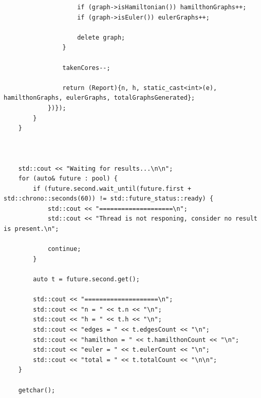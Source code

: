 \documentclass[a4paper,14pt]{extarticle}
\begin{document}
\begin{enumerate}[1.]
\begin{verbatim}
                    if (graph->isHamiltonian()) hamilthonGraphs++;
                    if (graph->isEuler()) eulerGraphs++;

                    delete graph;
                }

                takenCores--;

                return (Report){n, h, static_cast<int>(e), hamilthonGraphs, eulerGraphs, totalGraphsGenerated};
            })});
        }
    }



    std::cout << "Waiting for results...\n\n";
    for (auto& future : pool) {
        if (future.second.wait_until(future.first + std::chrono::seconds(60)) != std::future_status::ready) {
            std::cout << "====================\n";
            std::cout << "Thread is not responing, consider no result is present.\n";

            continue;
        }

        auto t = future.second.get();

        std::cout << "====================\n";
        std::cout << "n = " << t.n << "\n";
        std::cout << "h = " << t.h << "\n";
        std::cout << "edges = " << t.edgesCount << "\n";
        std::cout << "hamilthon = " << t.hamilthonCount << "\n";
        std::cout << "euler = " << t.eulerCount << "\n";
        std::cout << "total = " << t.totalCount << "\n\n";
    }

    getchar();


\end{verbatim}
\end{enumerate}
\end{document}
